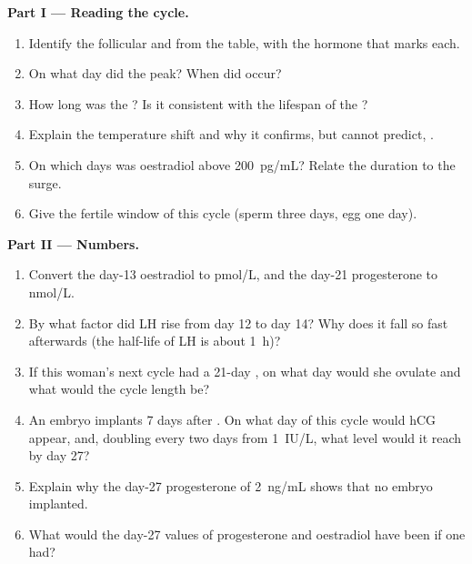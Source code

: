 \begin{problem}
\medskip
\noindent\textbf{Part I --- Reading the cycle.}
\begin{enumerate}
  \item Identify the follicular and  from the table,
        with the hormone that marks each.
  \item On what day did the  peak? When did  occur?
  \item How long was the ? Is it consistent with the
        lifespan of the ?
  \item Explain the temperature shift and why it confirms, but
        cannot predict, .
  \item On which days was oestradiol above \qty{200}{pg/mL}? Relate
        the duration to the surge.
  \item Give the fertile window of this cycle (sperm three days, egg
        one day).
\end{enumerate}

\medskip
\noindent\textbf{Part II --- Numbers.}
\begin{enumerate}[resume]
  \item Convert the day-13 oestradiol to \unit{pmol/L}, and the
        day-21 progesterone to \unit{nmol/L}.
  \item By what factor did LH rise from day 12 to day 14? Why does it
        fall so fast afterwards (the half-life of LH is about
        \qty{1}{h})?
  \item If this woman's next cycle had a 21-day , on
        what day would she ovulate and what would the cycle length
        be?
  \item An embryo implants 7 days after . On what day of
        this cycle would hCG appear, and, doubling every two days
        from \qty{1}{IU/L}, what level would it reach by day 27?
  \item Explain why the day-27 progesterone of \qty{2}{ng/mL} shows
        that no embryo implanted.
  \item What would the day-27 values of progesterone and oestradiol
        have been if one had?
\end{enumerate}


\end{problem}
